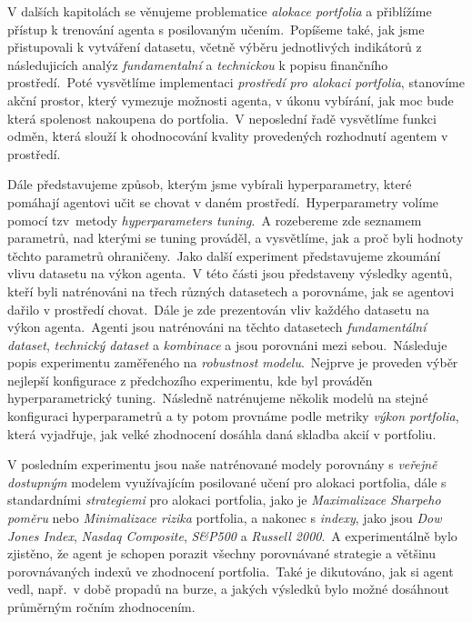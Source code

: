 {{        V dalších kapitolách se věnujeme problematice \emph{alokace portfolia} a přiblížíme přístup k trenování agenta s posilovaným učením.\ Popíšeme také, jak jsme přistupovali k vytváření datasetu, včetně výběru jednotlivých indikátorů z následujicích analýz \emph{fundamentalní} a \emph{technickou} k popisu finančního prostředí.\ Poté vysvětlíme implementaci \emph{prostředí pro alokaci portfolia}, stanovíme akční prostor, který vymezuje možnosti agenta, v úkonu vybírání, jak moc bude která spolenost nakoupena do portfolia.\ V neposlední řadě vysvětlíme funkci odměn, která slouží k ohodnocování kvality provedených rozhodnutí agentem v prostředí.

        Dále představujeme způsob, kterým jsme vybírali hyperparametry, které pomáhají agentovi učit se chovat v daném prostředí.\ Hyperparametry volíme pomocí tzv\  metody \emph{hyperparameters tuning}.\ A rozebereme zde seznamem parametrů, nad kterými se tuning prováděl, a vysvětlíme, jak a proč byli hodnoty těchto parametrů ohraničeny.\ Jako další experiment představujeme zkoumání vlivu datasetu na výkon agenta.\ V této části jsou představeny výsledky agentů, kteří byli natrénováni na třech různých datasetech a porovnáme, jak se agentovi dařilo v prostředí chovat.\ Dále je zde prezentován vliv každého datasetu na výkon agenta.\ Agenti jsou natrénováni na těchto datasetech \emph{fundamentální dataset}, \emph{technický dataset} a \emph{kombinace} a jsou porovnáni mezi sebou.\ Následuje popis experimentu zaměřeného na \emph{robustnost modelu}.\ Nejprve je proveden výběr nejlepší konfigurace z předchozího experimentu, kde byl prováděn hyperparametrický tuning.\ Následně natrénujeme několik modelů na stejné konfiguraci hyperparametrů a ty potom provnáme podle metriky \emph{výkon portfolia}, která vyjadřuje, jak velké zhodnocení dosáhla daná skladba akcií v portfoliu.

        V posledním experimentu jsou naše natrénované modely porovnány s \emph{veřejně dostupným} modelem využívajícím posilované učení pro alokaci portfolia, dále s standardními \emph{strategiemi} pro alokaci portfolia, jako je \emph{Maximalizace Sharpeho poměru} nebo \emph{Minimalizace rizika} portfolia, a nakonec s \emph{indexy}, jako jsou \emph{Dow Jones Index}, \emph{Nasdaq Composite}, \emph{S\&P500} a \emph{Russell 2000}.\ A experimentálně bylo zjistěno, že agent je schopen porazit všechny porovnávané strategie a většinu porovnávaných indexů ve zhodnocení portfolia.\ Také je dikutováno, jak si agent vedl, např.\ v době propadů na burze, a jakých výsledků bylo možné dosáhnout průměrným ročním zhodnocením.

}}

